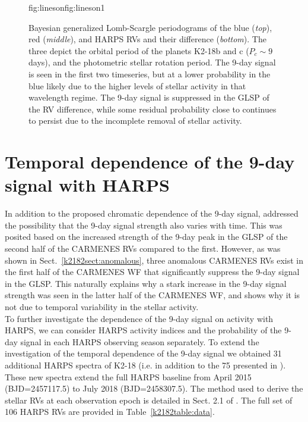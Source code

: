 \begin{figure}
\begin{ocg}{fig:lineson}{fig:lineson}{1}
  \end{ocg}
  \hspace{-0.6\hsize}%
  \caption[Bayesian Lomb-Scargle periodograms of the chromatic HARPS RVs.]
    {\small Bayesian generalized Lomb-Scargle periodograms of the blue (\emph{top}), red (\emph{middle}), and 
    HARPS RVs and their difference (\emph{bottom}). The three
     depict the orbital
    period of the planets K2-18b and c ($P_c\sim 9$ days), and the photometric stellar rotation period.
    The 9-day signal is seen in the first two timeseries, but at a lower probability in the blue likely due to the
    higher levels of stellar activity in that wavelength regime.
    The 9-day signal is suppressed in the GLSP of the RV difference, while some residual probability close to \prot{}
    continues to persist due to the incomplete removal of stellar activity.}
  \label{k2182fig:glspchrom}
\end{figure}


\section{Temporal dependence of the 9-day signal with HARPS} \label{k2182sect:temporal}
In addition to the proposed chromatic dependence of the 9-day signal,  addressed
the possibility that the 9-day signal strength also varies with time. This was posited based on the increased 
strength of the 9-day peak in the GLSP of the second half of the CARMENES RVs compared to the first. However, as was
shown in Sect.~\ref{k2182sect:anomalous}, three anomalous CARMENES RVs exist in the first half of the CARMENES WF
that significantly suppress the 9-day signal in the GLSP. This naturally explains why a stark increase in the 9-day
signal strength was seen in the latter half of the CARMENES WF, and shows why it is not due to temporal variability in the
stellar activity. \\

To further investigate the dependence of the 9-day signal on activity with HARPS, we can consider HARPS activity
indices and the probability of the 9-day signal in each HARPS observing season separately.
To extend the investigation of the temporal dependence of the 9-day signal we obtained 31 additional HARPS
spectra of K2-18 (i.e. in addition to the 75 presented in ).
These new spectra extend the full HARPS baseline from April 2015 (BJD=2457117.5) to July 2018
(BJD=2458307.5). The method used to derive the stellar RVs at each observation epoch is detailed
in Sect. 2.1 of . The full set of 106 HARPS RVs are provided in Table~\ref{k2182table:data}. \\

